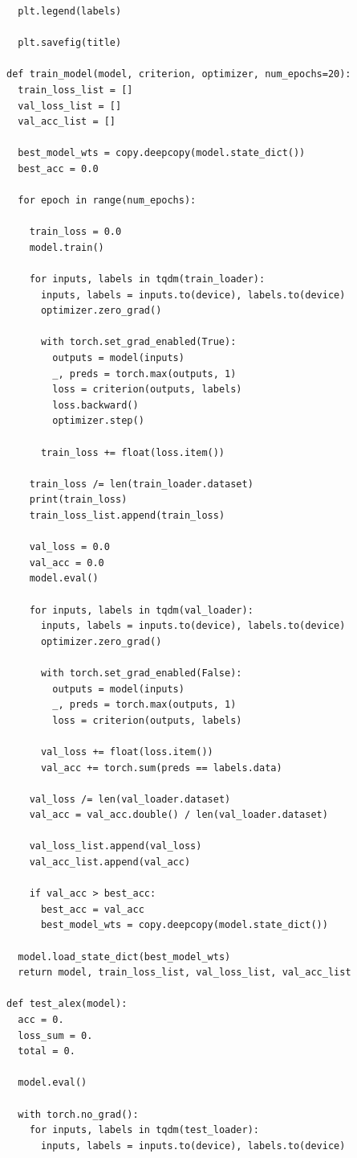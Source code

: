 \documentclass{article}
\newcommand{\1}{\mathbf{1}}
\begin{document}
{\begin{verbatim}
  plt.legend(labels)

  plt.savefig(title)

def train_model(model, criterion, optimizer, num_epochs=20):
  train_loss_list = []
  val_loss_list = []
  val_acc_list = []

  best_model_wts = copy.deepcopy(model.state_dict())
  best_acc = 0.0

  for epoch in range(num_epochs):

    train_loss = 0.0
    model.train()

    for inputs, labels in tqdm(train_loader):
      inputs, labels = inputs.to(device), labels.to(device)
      optimizer.zero_grad()
      
      with torch.set_grad_enabled(True):
        outputs = model(inputs)
        _, preds = torch.max(outputs, 1)
        loss = criterion(outputs, labels)
        loss.backward()
        optimizer.step()

      train_loss += float(loss.item())
    
    train_loss /= len(train_loader.dataset)
    print(train_loss)
    train_loss_list.append(train_loss)

    val_loss = 0.0
    val_acc = 0.0
    model.eval()
        
    for inputs, labels in tqdm(val_loader):
      inputs, labels = inputs.to(device), labels.to(device)
      optimizer.zero_grad()

      with torch.set_grad_enabled(False):
        outputs = model(inputs)
        _, preds = torch.max(outputs, 1)
        loss = criterion(outputs, labels)

      val_loss += float(loss.item())
      val_acc += torch.sum(preds == labels.data)
        
    val_loss /= len(val_loader.dataset)
    val_acc = val_acc.double() / len(val_loader.dataset)
    
    val_loss_list.append(val_loss)
    val_acc_list.append(val_acc)

    if val_acc > best_acc:
      best_acc = val_acc
      best_model_wts = copy.deepcopy(model.state_dict())
  
  model.load_state_dict(best_model_wts)
  return model, train_loss_list, val_loss_list, val_acc_list

def test_alex(model):
  acc = 0.
  loss_sum = 0.
  total = 0.

  model.eval()

  with torch.no_grad():
    for inputs, labels in tqdm(test_loader):
      inputs, labels = inputs.to(device), labels.to(device)


\end{verbatim}}
\end{document}
